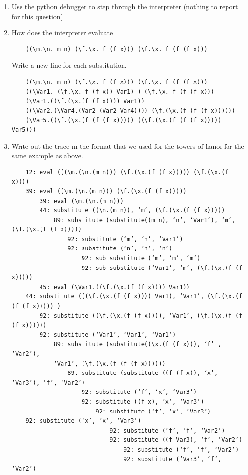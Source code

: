\documentclass{article}
\theoremstyle{theorem}
\theoremstyle{definition}
\theoremstyle{remark}
\begin{document}
\begin{enumerate}
\begin{lstlisting}
      (\f. \x. f (f x)) (\x. x)
      \end{lstlisting}
    \item Use the python debugger to step through the interpreter (nothing to report for this question)
    \item How does the interpreter evaluate
    \begin{lstlisting}
    ((\m.\n. m n) (\f.\x. f (f x))) (\f.\x. f (f (f x)))
    \end{lstlisting}Write a new line for each substitution.
    \begin{verbatim}
    ((\m.\n. m n) (\f.\x. f (f x))) (\f.\x. f (f (f x)))
    ((\Var1. (\f.\x. f (f x)) Var1) ) (\f.\x. f (f (f x)))
    (\Var1.((\f.(\x.(f (f x)))) Var1))
    ((\Var2.(\Var4.(Var2 (Var2 Var4)))) (\f.(\x.(f (f (f x))))))
    (\Var5.((\f.(\x.(f (f (f x))))) ((\f.(\x.(f (f (f x))))) Var5)))
    \end{verbatim}
    \item Write out the trace in the format that we used for the towers of hanoi for the same
    example as above.
  \begin{verbatim}
    12: eval (((\m.(\n.(m n))) (\f.(\x.(f (f x))))) (\f.(\x.(f x))))
    39: eval ((\m.(\n.(m n))) (\f.(\x.(f (f x)))))
        39: eval (\m.(\n.(m n)))
        44: substitute ((\n.(m n)), ‘m’, (\f.(\x.(f (f x)))))
            89: substitute (substitute((m n), ‘n’, ‘Var1’), ‘m’, (\f.(\x.(f (f x)))))
                92: substitute (‘m’, ‘n’, ‘Var1’)
                92: substitute (‘n’, ‘n’, ‘n’)
                    92: sub substitute (‘m’, ‘m’, ‘m’)
                    92: sub substitute (‘Var1’, ‘m’, (\f.(\x.(f (f x)))))
        45: eval (\Var1.((\f.(\x.(f (f x)))) Var1))
    44: substitute (((\f.(\x.(f (f x)))) Var1), ‘Var1’, (\f.(\x.(f (f (f x))))) )
        92: substitute ((\f.(\x.(f (f x)))), ‘Var1’, (\f.(\x.(f (f (f x))))))
        92: substitute (‘Var1’, ‘Var1’, ‘Var1’)
            89: substitute (substitute((\x.(f (f x))), ‘f’ , ‘Var2’),
            ‘Var1’, (\f.(\x.(f (f (f x))))))
                89: substitute (substitute ((f (f x)), ‘x’, ‘Var3’), ‘f’, ‘Var2’)
                    92: substitute (‘f’, ‘x’, ‘Var3’)
                    92: substitute ((f x), ‘x’, ‘Var3’)
                        92: substitute (‘f’, ‘x’, ‘Var3’)
    92: substitute (‘x’, ‘x’, ‘Var3’)
                            92: substitute (‘f’, ‘f’, ‘Var2’)
                            92: substitute ((f Var3), ‘f’, ‘Var2’)
                                92: substitute (‘f’, ‘f’, ‘Var2’)
                                92: substitute (’Var3’, ‘f’, ‘Var2’)

\end{verbatim}
\end{enumerate}
\end{document}
